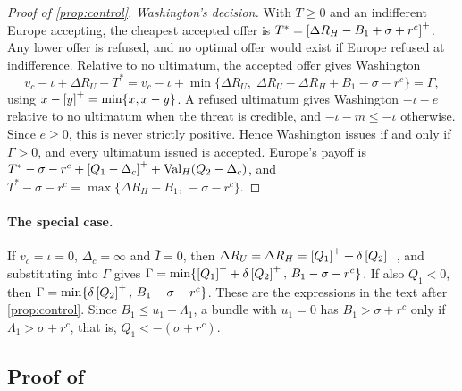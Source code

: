 \begin{proof}[Proof of \cref{prop:control}]
\emph{Washington's decision.} With $T\ge 0$ and an indifferent Europe accepting, the cheapest accepted offer is $T^*=\left[\Delta R_H-B_1+\sigma+r^c\right]^{+}$. Any lower offer is refused, and no optimal offer would exist if Europe refused at indifference. Relative to no ultimatum, the accepted offer gives Washington
\[
v_c-\iota+\Delta R_U-T^*=v_c-\iota+\min\{\Delta R_U,\;\Delta R_U-\Delta R_H+B_1-\sigma-r^c\}=\Gamma,
\]
using $x-\left[y\right]^{+}=\min\{x,x-y\}$. A refused ultimatum gives Washington $-\iota-e$ relative to no ultimatum when the threat is credible, and $-\iota-m\le-\iota$ otherwise. Since $e\ge 0$, this is never strictly positive. Hence Washington issues if and only if $\Gamma>0$, and every ultimatum issued is accepted. Europe's payoff is $T^*-\sigma-r^c+\left[Q_1-\Delta_c\right]^{+}+\mathrm{Val}_H(Q_2-\Delta_c)$, and $T^*-\sigma-r^c=\max\{\Delta R_H-B_1,\,-\sigma-r^c\}$.
\end{proof}

\paragraph{The special case.} If $v_c=\iota=0$, $\Delta_c=\infty$ and $\bar I=0$, then $\Delta R_U=\Delta R_H=\left[Q_1\right]^{+}+\delta\left[Q_2\right]^{+}$, and substituting into $\Gamma$ gives $\Gamma=\min\{\left[Q_1\right]^{+}+\delta\left[Q_2\right]^{+},\,B_1-\sigma-r^c\}$. If also $Q_1<0$, then $\Gamma=\min\{\delta\left[Q_2\right]^{+},\,B_1-\sigma-r^c\}$. These are the expressions in the text after \cref{prop:control}. Since $B_1\le u_1+\Lambda_1$, a bundle with $u_1=0$ has $B_1>\sigma+r^c$ only if $\Lambda_1>\sigma+r^c$, that is, $Q_1<-(\sigma+r^c)$.

\subsection{Proof of \texorpdfstring{}{control under a general settlement}}


